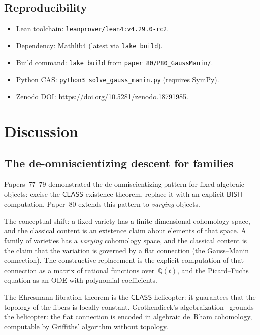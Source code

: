 \documentclass[11pt]{article}
\theoremstyle{plain}
\theoremstyle{definition}
\theoremstyle{remark}
\newcommand{\Q}{\mathbb{Q}}
\newcommand{\BISH}{\mathsf{BISH}}
\newcommand{\CLASS}{\mathsf{CLASS}}
\begin{document}
\subsection{Reproducibility}

\begin{itemize}[nosep]
\item Lean toolchain: \texttt{leanprover/lean4:v4.29.0-rc2}.
\item Dependency: Mathlib4 (latest via \texttt{lake build}).
\item Build command: \texttt{lake build} from
  \texttt{paper~80/P80\_GaussManin/}.
\item Python CAS: \texttt{python3 solve\_gauss\_manin.py}
  (requires SymPy).
\item Zenodo DOI: \url{https://doi.org/10.5281/zenodo.18791985}.
\end{itemize}


\section{Discussion}\label{sec:discussion}

\subsection{The de-omniscientizing descent for families}

Papers~77--79 demonstrated the de-omniscientizing pattern for
fixed algebraic objects: excise the $\CLASS$ existence theorem,
replace it with an explicit $\BISH$ computation.  Paper~80 extends
this pattern to \emph{varying} objects.

The conceptual shift: a fixed variety has a finite-dimensional
cohomology space, and the classical content is an existence claim
about elements of that space.  A family of varieties has a
\emph{varying} cohomology space, and the classical content is the
claim that the variation is governed by a flat connection (the
Gauss--Manin connection).  The constructive replacement is the
explicit computation of that connection as a matrix of rational
functions over~$\Q(t)$, and the Picard--Fuchs equation as an ODE
with polynomial coefficients.

The Ehresmann fibration theorem is the $\CLASS$ helicopter: it
guarantees that the topology of the fibers is locally constant.
Grothendieck's algebraization~\cite{Grothendieck1966} grounds the
helicopter: the flat connection is encoded in algebraic de~Rham
cohomology, computable by Griffiths' algorithm without topology.
\end{document}
